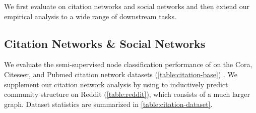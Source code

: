 \label{sec:experiment}

We first evaluate \method{} on citation networks and social networks and then extend our empirical analysis to a wide range of downstream tasks.
%
\subsection{Citation Networks \& Social Networks} \label{sec:citation-networks}
We evaluate the semi-supervised node classification performance of \method{} on the Cora, Citeseer, and Pubmed citation network datasets (\autoref{table:citation-base}) \cite{sen2008collective}. 
We supplement our citation network analysis by using \method{} to inductively predict community structure on Reddit (\autoref{table:reddit}), which consists of a much larger graph. Dataset statistics are summarized in \autoref{table:citation-dataset}.

